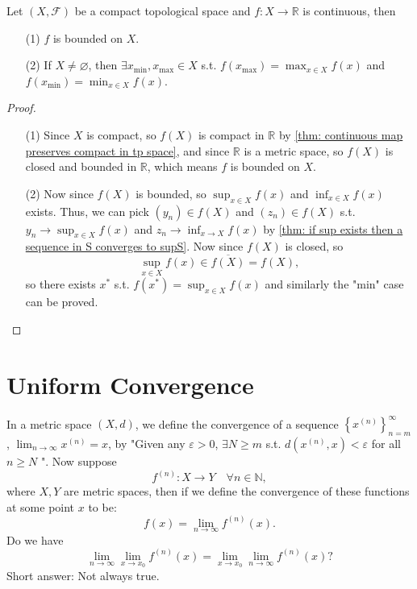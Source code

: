 \begin{proposition}
    Let \((X, \mathcal{F} )\) be a compact topological space and \(f: X \to \mathbb{R} \) is continuous, then 
    \begin{itemize}
        \item [(1)] \(f\) is bounded on \(X\). 
        \item [(2)] If \(X \neq \varnothing \), then \(\exists x_{\text{min}}, x_{\text{max}} \in X\) s.t. \(f \left( x_{\text{max}} \right) = \max _{x \in X} f(x) \) and \(f \left( x_{\text{min}} \right) = \min _{x \in X} f(x) \).      
    \end{itemize} 
\end{proposition}
\begin{proof}
    \vphantom{text}
    \begin{itemize}
        \item [(1)] Since \(X\) is compact, so \(f(X)\) is compact in \(\mathbb{R} \) by \autoref{thm: continuous map preserves compact in tp space}, and since \(\mathbb{R} \) is a metric space, so \(f(X)\) is closed and bounded in \(\mathbb{R} \), which means \(f\) is bounded on \(X\).        
        \item [(2)] Now since \(f(X)\) is bounded, so \(\sup _{x \in X} f(x)\) and \(\inf _{x \in X} f(x)\) exists. Thus, we can pick \(\left( y_n \right) \in f(X) \) and \(\left( z_n \right) \in f(X) \) s.t. \(y_n \to \sup _{x \in X} f(x)\) and \(z_n \to \inf _{x \to X} f(x)\) by \autoref{thm: if sup exists then a sequence in S converges to supS}. Now since \(f(X)\) is closed, so  
        \[
            \sup _{x \in X} f(x) \in \overline{f(X)} = f(X),
        \] so there exists \(x^*\) s.t. \(f \left( x^* \right) = \sup _{x \in X} f(x) \) and similarly the "min" case can be proved.   
    \end{itemize}
\end{proof}

\chapter{Uniform Convergence}
In a metric space \((X, d)\), we define the convergence of a sequence \(\left\{ x^{(n)} \right\}_{n=m}^{\infty}  \), \(\lim_{n \to \infty} x^{(n)} = x \), by "Given any \(\varepsilon > 0\), \(\exists N \ge m\) s.t. \(d \left( x^{(n)}, x \right) < \varepsilon \) for all \(n \ge N\) ". Now suppose 
\[
    f^{(n)}: X \to Y \quad \forall n \in \mathbb{N},
\] where \(X, Y\) are metric spaces, then if we define the convergence of these functions at some point \(x\) to be: 
\[
    f(x) = \lim_{n \to \infty} f^{(n)}(x).
\] Do we have 
\[
    \lim_{n \to \infty} \lim_{x \to x_0} f^{(n)}(x) = \lim_{x \to x_0} \lim_{n \to \infty} f^{(n)} (x)?    
\]
Short answer: Not always true.

